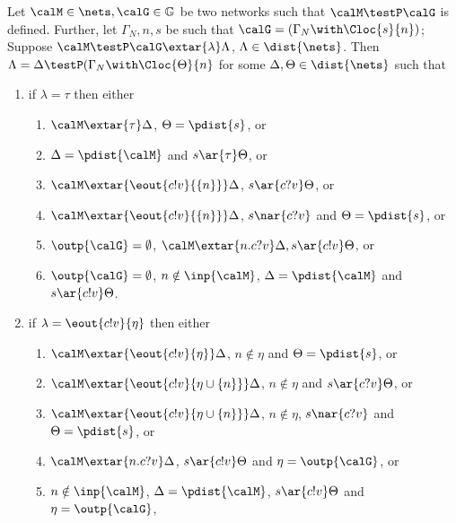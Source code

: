 \documentclass{LMCS}
\begin{document}
\begin{prop}\label{prop:decomp}
  Let $\calM \in \nets, \calG \in \mathbb{G}$ be two networks such that $\calM \testP \calG$ 
  is defined. Further, let $\Gamma_N, n, s$ be such 
  that $\calG = (\Gamma_N \with \Cloc{s}{n})$; 
  Suppose $\calM \testP\calG \extar{\lambda} \Lambda$, $\Lambda \in \dist{\nets}$. 
  Then $\Lambda = \Delta \testP (\Gamma_N \with \Cloc{\Theta}{n}$ for some 
  $\Delta, \Theta \in \dist{\nets}$ such that 
  
  \begin{enumerate}\item if $\lambda = \tau$ then either 
		\begin{enumerate}[label=(\roman*)]
			\item $\calM \extar{\tau} \Delta$, $\Theta = \pdist{s}$, or
			\item $\Delta = \pdist{\calM}$ and $s \ar{\tau} \Theta$, or 
			\item $\calM \extar{\eout{c!v}{\{n\}}} \Delta$, 
			$s \ar{c?v} \Theta$, or
			\item $\calM \extar{\eout{c!v}{\{n\}}} \Delta$, $s \nar{c?v}$ and 
			$\Theta = \pdist{s}$, or
			\item $\outp{\calG} = \emptyset$, 
			$\calM \extar{n.c?v} \Delta, s \ar{c!v} \Theta$, or 
			\item $\outp{\calG} = \emptyset$, 
			$n \notin \inp{\calM}$, $\Delta = \pdist{\calM}$ and 
			$s \ar{c!v} \Theta$.
		\end{enumerate}
		
		\item if $\lambda = \eout{c!v}{\eta}$ then either
		 \begin{enumerate}[label=(\roman*)]
		 \item $\calM \extar{\eout{c!v}{\eta}} \Delta$, 
		 $n \notin \eta$ and $\Theta = \pdist{s}$, or  
		 \item $\calM \extar{\eout{c!v}{\eta \cup \{n\}}} \Delta$, 
		 $n \notin \eta$ and $s \ar{c?v} \Theta$, or 
		 \item $\calM \extar{\eout{c!v}{\eta \cup \{n\}}} \Delta$, 
		 $n \notin \eta$, $s \nar{c?v}$ and $\Theta = \pdist{s}$, or
		 \item $\calM \extar{n.c?v} \Delta$, $s \ar{c!v} \Theta$ 
		 and $\eta = \outp{\calG}$, or 
		 \item $n \notin \inp{\calM}$, $\Delta = \pdist{\calM}$, 
		 $s \ar{c!v} \Theta$ and $\eta = \outp{\calG}$,
		 \end{enumerate}
		

\end{enumerate}
\end{prop}
\end{document}
